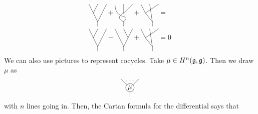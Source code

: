  \begin{align*}
   {\begin{xy}<\diagramsize,0em>:
     (0,1);(.5,0) **@{-},
     (1,1);(.5,0) **@{-},
     (.5,0);(1,-1) **@{-},
     (2,1);(1,-1) **@{-},
     (1,-1);(1,-1.5) **@{-},
   \end{xy}} +
   {\begin{xy}<\diagramsize,0em>:
     (0,1);(1,-1) **\crv{(0,-1)&(2,0)},
     (1,1);(1,0) **@{-},
     (2,1);(1,0) **@{-},
     (1,0);(1,-1) **\crv{(0,-.5)},
     (1,-1);(1,-1.5) **@{-},
   \end{xy}} +
   {\begin{xy}<\diagramsize,0em>:
     (0,1);(.5,0) **@{-},
     (1,1);(1.3,-1) **@{-},
     (2,1);(.5,0) **@{-},
     (.5,0);(1.3,-1) **@{-},
     (1.3,-1);(1.3,-1.5) **@{-},
   \end{xy}} &= \\
   {\begin{xy}<\diagramsize,0em>:
     (0,1);(.5,0) **@{-},
     (1,1);(.5,0) **@{-},
     (.5,0);(1,-1) **@{-},
     (2,1);(1,-1) **@{-},
     (1,-1);(1,-1.5) **@{-},
   \end{xy}} -
   {\begin{xy}<\diagramsize,0em>:
     (0,1);(1,-1) **@{-},
     (1,1);(1.5,0) **@{-},
     (2,1);(1.5,0) **@{-},
     (1.5,0);(1,-1) **@{-},
     (1,-1);(1,-1.5) **@{-},
   \end{xy}} +
   {\begin{xy}<\diagramsize,0em>:
     (0,1);(.5,0) **@{-},
     (1,1);(1.3,-1) **@{-},
     (2,1);(.5,0) **@{-},
     (.5,0);(1.3,-1) **@{-},
     (1.3,-1);(1.3,-1.5) **@{-},
   \end{xy}} &= 0
 \end{align*}
We can also use pictures to represent cocycles.  Take $\mu \in H^n(\mathfrak{g}, \mathfrak{g})$.  Then we
draw $\mu$ as
\[{\begin{xy}<\diagramsize,0em>:
   (1,0) *+{\mu} *\cir{};
   (0,1) **@{-}, (2,1) **@{-}, (1,-1) **@{-},
   (1,.8) *{\dots}
 \end{xy}}\]
 with $n$ lines going in.  Then, the Cartan formula for the differential says that


